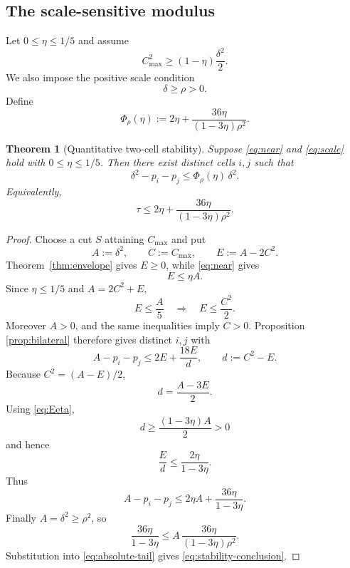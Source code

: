 \documentclass[11pt]{article}
\newtheorem{theorem}{Theorem}[section]
\newcommand{\cmax}{C_{\max}}
\newcommand{\dd}{\delta}
\newcommand{\etaq}{\eta}
\newcommand{\tauq}{\tau}
\newcommand{\PhiRho}{\Phi_{\rho}}
\begin{document}
\subsection{The scale-sensitive modulus}

Let $0\le\etaq\le1/5$ and assume
\begin{equation}\label{eq:near}
  \cmax^2
  \ge
  (1-\etaq)\frac{\dd^2}{2}.
\end{equation}
We also impose the positive scale condition
\begin{equation}\label{eq:scale}
  \dd\ge\rho>0.
\end{equation}
Define
\begin{equation}\label{eq:modulus}
  \PhiRho(\etaq):=
  2\etaq+
  \frac{36\etaq}{(1-3\etaq)\rho^2}.
\end{equation}

\begin{theorem}[Quantitative two-cell stability]\label{thm:stability}
Suppose \eqref{eq:near} and \eqref{eq:scale} hold with
$0\le\etaq\le1/5$.  Then there exist distinct cells $i,j$ such that
\begin{equation}\label{eq:stability-conclusion}
  \boxed{
  \dd^2-p_i-p_j
  \le
  \PhiRho(\etaq)\,\dd^2.
  }
\end{equation}
Equivalently,
\[
  \tauq\le
  2\etaq+
  \frac{36\etaq}{(1-3\etaq)\rho^2}.
\]
\end{theorem}

\begin{proof}
Choose a cut $S$ attaining $\cmax$ and put
\[
  A:=\dd^2,\qquad C:=\cmax,\qquad E:=A-2C^2.
\]
Theorem~\ref{thm:envelope} gives $E\ge0$, while
\eqref{eq:near} gives
\begin{equation}\label{eq:Eeta}
  E\le\etaq A.
\end{equation}
Since $\etaq\le1/5$ and $A=2C^2+E$,
\[
  E\le\frac A5
  \quad\Longrightarrow\quad
  E\le\frac{C^2}{2}.
\]
Moreover $A>0$, and the same inequalities imply $C>0$.  Proposition
\ref{prop:bilateral} therefore gives distinct $i,j$ with
\[
  A-p_i-p_j
  \le
  2E+\frac{18E}{d},
  \qquad
  d:=C^2-E.
\]
Because $C^2=(A-E)/2$,
\begin{equation}\label{eq:didentity}
  d=\frac{A-3E}{2}.
\end{equation}
Using \eqref{eq:Eeta},
\[
  d\ge\frac{(1-3\etaq)A}{2}>0
\]
and hence
\[
  \frac Ed
  \le
  \frac{2\etaq}{1-3\etaq}.
\]
Thus
\begin{equation}\label{eq:absolute-tail}
  A-p_i-p_j
  \le
  2\etaq A+
  \frac{36\etaq}{1-3\etaq}.
\end{equation}
Finally $A=\dd^2\ge\rho^2$, so
\[
  \frac{36\etaq}{1-3\etaq}
  \le
  A\,
  \frac{36\etaq}{(1-3\etaq)\rho^2}.
\]
Substitution into \eqref{eq:absolute-tail} gives
\eqref{eq:stability-conclusion}.
\end{proof}
\end{document}

